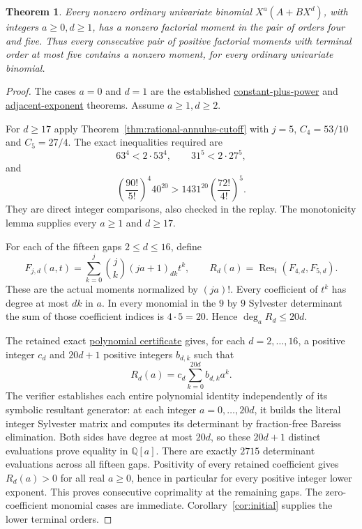\documentclass[11pt]{article}
\newtheorem{theorem}{Theorem}
\begin{document}
\begin{theorem}\label{thm:ordinary-fifth}
Every nonzero ordinary univariate binomial $X^a(A+BX^d)$,
with integers $a\ge0,d\ge1$, has a nonzero factorial moment in the
pair of orders four and five.
Thus every consecutive pair of positive factorial moments with
terminal order at most five contains a nonzero moment, for every
ordinary univariate binomial.
\end{theorem}
\begin{proof}
The cases $a=0$ and $d=1$ are the established
\href{ALL_UNIVARIATE_TWO_TERM_SFC.tex}{constant-plus-power} and
\href{UNIFORM_PADE_PARABOLA_SFC.tex}{adjacent-exponent} theorems.
Assume $a\ge1,d\ge2$.

For $d\ge17$ apply Theorem~\ref{thm:rational-annulus-cutoff}
with $j=5$, $C_4=53/10$ and $C_5=27/4$.
The exact inequalities required are
\[
 63^4<2\cdot53^4,\qquad 31^5<2\cdot27^5,
\]
and
\[
 \left(\frac{90!}{5!}\right)^4 40^{20}>
 1431^{20}\left(\frac{72!}{4!}\right)^5 .
\]
They are direct integer comparisons, also checked in the replay.
The monotonicity lemma supplies every $a\ge1$ and $d\ge17$.

For each of the fifteen gaps $2\le d\le16$, define
\[
 F_{j,d}(a,t)=
 \sum_{k=0}^j\binom jk(ja+1)_{dk}t^k,\qquad
 R_d(a)=\operatorname{Res}_t(F_{4,d},F_{5,d}).
\]
These are the actual moments normalized by $(ja)!$.
Every coefficient of $t^k$ has degree at most $dk$ in $a$.
In every monomial in the $9$ by $9$ Sylvester determinant
the sum of those coefficient indices is $4\cdot5=20$.
Hence $\deg_aR_d\le20d$.

The retained exact
\href{lower_exponent_initial_and_boundary_terminal_five_certificates.json}{polynomial certificate}
gives, for each $d=2,\ldots,16$, a positive integer $c_d$ and
$20d+1$ positive integers $b_{d,k}$ such that
\[
 R_d(a)=c_d\sum_{k=0}^{20d}b_{d,k}a^k .
\]
The verifier establishes each entire polynomial identity independently
of its symbolic resultant generator: at each integer
$a=0,\ldots,20d$, it builds the literal integer Sylvester matrix
and computes its determinant by fraction-free Bareiss elimination.
Both sides have degree at most $20d$, so these $20d+1$ distinct
evaluations prove equality in $\mathbb Q[a]$.
There are exactly $2715$ determinant evaluations across all fifteen
gaps. Positivity of every retained coefficient gives $R_d(a)>0$
for all real $a\ge0$, hence in particular for every positive integer
lower exponent. This proves consecutive coprimality at the remaining
gaps. The zero-coefficient monomial cases are immediate.
Corollary~\ref{cor:initial} supplies the lower terminal orders.
\end{proof}
\end{document}
